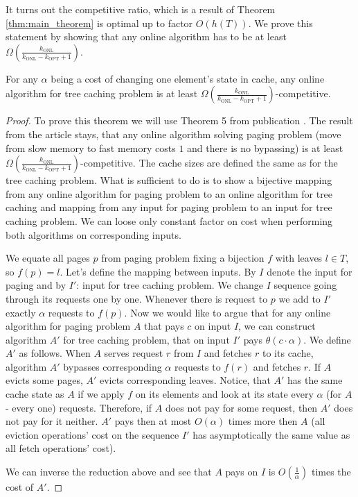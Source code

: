 It turns out the competitive ratio, which is a result of Theorem 
\ref{thm:main_theorem} is optimal up to factor $O(h(T))$. We prove this 
statement by showing that any online algorithm has to be at least 
$\Omega (\frac{k_{\mathrm{ONL}}}{k_{\mathrm{ONL}}- k_{\mathrm{OPT}} + 1})$.
\begin{theorem}
For any $\alpha$ being a cost of changing one element's state in cache, any 
online algorithm for tree caching problem is at least $\Omega 
(\frac{k_{\mathrm{ONL}}}{k_{\mathrm{ONL}}- k_{\mathrm{OPT}} + 1})$-competitive.
\end{theorem}
\begin{proof}
To prove this theorem we will use Theorem 5 from publication \cite{tarjan}. The 
result from the article stays, that any online algorithm solving paging problem 
(move from slow memory to fast memory costs $1$ and there is no bypassing) is 
at least $\Omega(\frac{k_{\mathrm{ONL}}}{k_{\mathrm{ONL}}- k_{\mathrm{OPT}} + 
1})$-competitive. The cache sizes are defined the same as for the tree caching 
problem. What is sufficient to do is to show a bijective mapping from any 
online algorithm for paging problem to an online algorithm for tree caching and 
mapping from any input for paging problem to an input for tree caching 
problem. We can loose only constant factor on cost when performing both 
algorithms on corresponding inputs.

We equate all pages $p$ from paging problem fixing a bijection $f$ with leaves 
$l \in T$, so $f(p) = l$. Let's define the mapping between inputs. By $I$ 
denote the input for paging and by $I'$: input for tree caching problem. We 
change $I$ sequence going through its requests one by one. Whenever there is 
request to $p$ we add to $I'$ exactly $\alpha$ requests to $f(p)$. Now we would 
like to argue that for any online algorithm for paging problem $A$ that pays 
$c$ on input $I$, we can construct algorithm $A'$ for tree caching problem, that 
on input $I'$ pays $\theta(c \cdot \alpha)$. We define $A'$ as follows. 
When $A$ serves request $r$ from $I$ and fetches $r$ to its cache, algorithm 
$A'$ bypasses corresponding $\alpha$ requests to $f(r)$ and fetches $r$. If $A$ 
evicts some pages, $A'$ evicts corresponding leaves. Notice, that $A'$ has the 
same cache state as $A$ if we apply $f$ on its elements and look at its state 
every $\alpha$ (for $A$ - every one) requests. Therefore, if $A$ does not pay 
for some request, then $A'$ does not pay for it neither. $A'$ pays then at most 
$O(\alpha)$ times more then $A$ (all eviction operations' cost on the sequence 
$I'$ has asymptotically the same value as all fetch operations' cost).

We can inverse the reduction above and see that $A$ pays on $I$ is 
$O(\frac{1}{\alpha})$ times the cost of $A'$.  
  
\end{proof}
